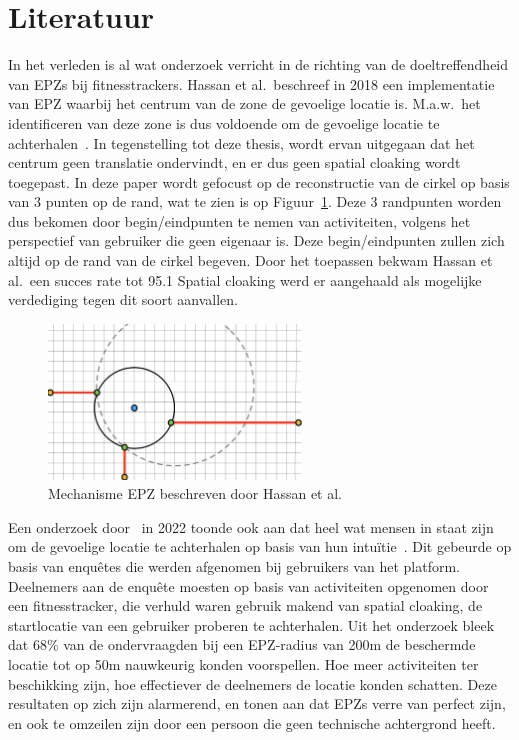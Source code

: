 \section{Literatuur}
In het verleden is al wat onderzoek verricht in de richting van de
doeltreffendheid van \acp{EPZ} bij fitnesstrackers. Hassan et al.\ beschreef in
2018 een implementatie van EPZ waarbij het centrum van de zone de gevoelige
locatie is. M.a.w.\ het identificeren van deze zone is dus voldoende om de
gevoelige locatie te achterhalen~\cite{sec18has3:online}. In tegenstelling tot
deze thesis, wordt ervan uitgegaan dat het centrum geen translatie ondervindt,
en er dus geen spatial cloaking wordt toegepast. In deze paper wordt gefocust
op de reconstructie van de cirkel op basis van 3 punten op de rand, wat te zien
is op Figuur~\ref{fig:Hassan_EPZ}. Deze 3 randpunten worden dus bekomen door
begin/eindpunten te nemen van activiteiten, volgens het perspectief van
gebruiker die geen eigenaar is. Deze begin/eindpunten zullen zich altijd op de
rand van de cirkel begeven. Door het toepassen bekwam Hassan et al.\ een succes
rate tot 95.1 Spatial cloaking werd er aangehaald als mogelijke verdediging
tegen dit soort aanvallen.
\begin{figure}[h]
    \centering
    \includegraphics[width=0.6\textwidth]{fig/EPZ-mechanisme/Hassan.png}
    \caption{Mechanisme \ac{EPZ} beschreven door Hassan et al.}\label{fig:Hassan_EPZ}
\end{figure}

Een onderzoek door~\citeauthor{10.1145/3491102.3502136} in 2022 toonde ook aan
dat heel wat mensen in staat zijn om de gevoelige locatie te achterhalen op
basis van hun intuïtie~\cite{10.1145/3491102.3502136}. Dit gebeurde op basis
van enquêtes die werden afgenomen bij gebruikers van het platform. Deelnemers
aan de enquête moesten op basis van activiteiten opgenomen door een
fitnesstracker, die verhuld waren gebruik makend van spatial cloaking, de
startlocatie van een gebruiker proberen te achterhalen. Uit het onderzoek bleek
dat 68\% van de ondervraagden bij een \ac{EPZ}-radius van 200m de beschermde
locatie tot op 50m nauwkeurig konden voorspellen. Hoe meer activiteiten ter
beschikking zijn, hoe effectiever de deelnemers de locatie konden schatten.
Deze resultaten op zich zijn alarmerend, en tonen aan dat \acp{EPZ} verre van
perfect zijn, en ook te omzeilen zijn door een persoon die geen technische
achtergrond heeft.

